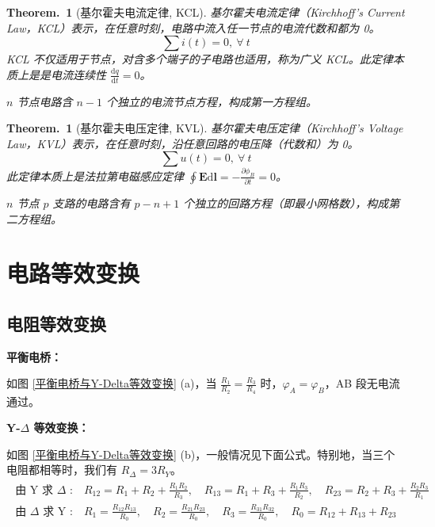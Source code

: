 \documentclass[UTF8]{report}
\def\p{\partial}
\theoremstyle{MyLineTheoremStyle} %
\theoremstyle{MyBlockTheoremStyle} %
\newtheorem{BlockTheorem}[LineTheorem]{Theorem.\,} %
\theoremstyle{MySubsubsectionStyle} %
\begin{document}
\begin{BlockTheorem}[基尔霍夫电流定律, KCL]
基尔霍夫电流定律（Kirchhoff's Current Law，KCL）表示，在任意时刻，电路中流入任一节点的电流代数和都为 0。
\begin{equation}
\sum i(t) = 0,\ \forall\ t 
\end{equation}
KCL 不仅适用于节点，对含多个端子的子电路也适用，称为广义 KCL。此定律本质上是是电流连续性 $\frac{\mathrm{d}q}{\mathrm{d}t} = 0$。

$n$ 节点电路含 $n-1$ 个独立的电流节点方程，构成第一方程组。
\end{BlockTheorem}

\begin{BlockTheorem}[基尔霍夫电压定律, KVL]
基尔霍夫电压定律（Kirchhoff's Voltage Law，KVL）表示，在任意时刻，沿任意回路的电压降（代数和）为 0。
\begin{equation}
\sum u(t) = 0,\ \forall\ t
\end{equation}
此定律本质上是法拉第电磁感应定律 $\oint \boldsymbol{E} \mathrm{d}\boldsymbol{l} = -\frac{\p \phi_B}{\p t} = 0$。

$n$ 节点 $p$ 支路的电路含有 $p-n+1$ 个独立的回路方程（即最小网格数），构成第二方程组。
\end{BlockTheorem}


\section{电路等效变换}

\subsection{电阻等效变换}

\noindent\textbf{平衡电桥：}

如图 \ref{平衡电桥与Y-Delta等效变换} (a)，当 $\frac{R_1}{R_2} = \frac{R_3}{R_4}$ 时，$\varphi_A = \varphi_B$，AB 段无电流通过。 

\noindent\textbf{Y-$\Delta$ 等效变换：}

如图 \ref{平衡电桥与Y-Delta等效变换} (b)，一般情况见下面公式。特别地，当三个电阻都相等时，我们有 $R_{\Delta} = 3R_Y$。
\begin{gather}
\boxed{
\begin{matrix}
    \text{由 Y 求 $\Delta$ :}\quad R_{12}= R_1 + R_2 + \frac{R_1R_2}{R_3}, \quad
    R_{13}=R_1 + R_3 + \frac{R_1R_3}{R_2} , \quad
    R_{23}=R_2 + R_3 + \frac{R_2R_3}{R_1} \\ 
    \text{由 $\Delta$ 求 Y :}\quad R_{1}=\frac{R_{12}R_{13}}{R_0}, \quad
    R_{2}=\frac{R_{21}R_{23}}{R_0}, \quad
    R_{3}=\frac{R_{31}R_{32}}{R_0},\quad 
    R_0 = R_{12}+R_{13}+R_{23} 
\end{matrix}
}
\end{gather}
\end{document}
